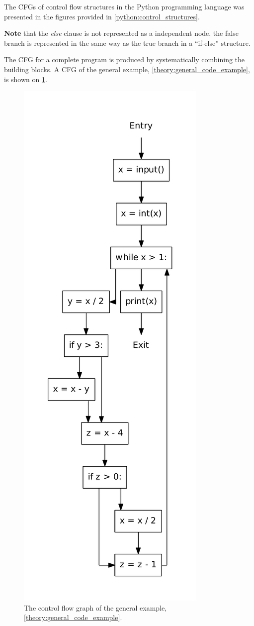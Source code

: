 The CFGs of  control flow structures in the Python programming language was presented in the figures provided in \cref{python:control_structures}.

\textbf{Note} that the \textit{else} clause is not represented as a independent node, the false branch is represented in the same way as the true branch in a ``if-else'' structure.

The CFG for a complete program is produced by systematically combining the building blocks.
A CFG of the general example, \cref{theory:general_code_example}, is shown on \cref{theory:general_code_example_cfg}.

\begin{figure}
  \center
  \includegraphics[width=.5\textwidth]{figures/general_example.pdf}
  \caption{The control flow graph of the general example, \cref{theory:general_code_example}.}
  \label{theory:general_code_example_cfg}
\end{figure}
